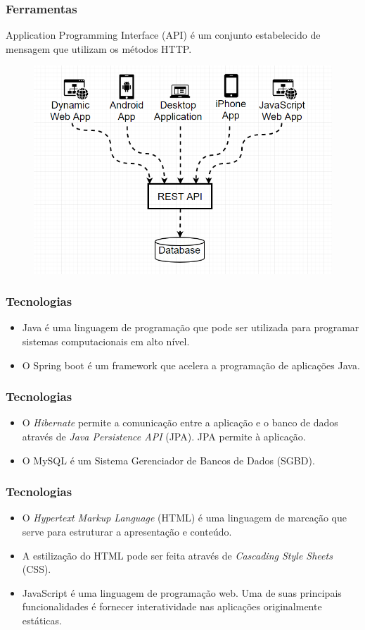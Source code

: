 \documentclass{beamer}
\begin{document}
	\begin{frame}\frametitle{Ferramentas}
		Application Programming Interface (API) é um conjunto estabelecido de mensagem que utilizam os métodos HTTP.
			\begin{figure}[ht]
				\centering
				\includegraphics[scale=0.3]{img/rest_api.png}
			\end{figure}
	\end{frame}

	\begin{frame}\frametitle{Tecnologias}
		\begin{itemize}
			\item Java é uma linguagem de programação que pode ser utilizada para programar sistemas computacionais em alto nível.
			\item O Spring boot é um framework que acelera a programação de aplicações Java.
		\end{itemize}
	\end{frame}

	\begin{frame}\frametitle{Tecnologias}
		\begin{itemize}
			\item O \textit{Hibernate} permite a comunicação entre a aplicação e o banco de dados através de \textit{Java Persistence API} (JPA). JPA permite à aplicação.
			\item O MySQL é um Sistema Gerenciador de Bancos de Dados (SGBD).
		\end{itemize}
	\end{frame}

	\begin{frame}\frametitle{Tecnologias}
		\begin{itemize}
			\item O \textit{Hypertext Markup Language} (HTML) é uma linguagem de marcação que serve para estruturar a apresentação e conteúdo.
			\item A estilização do HTML pode ser feita através de \textit{Cascading Style Sheets} (CSS).
			\item JavaScript é uma linguagem de programação web. Uma de suas principais funcionalidades é fornecer interatividade nas aplicações originalmente estáticas.
		\end{itemize}
	\end{frame}
\end{document}
